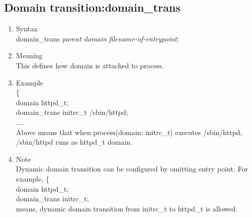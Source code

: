 \documentclass{article}
\begin{document}
\subsection{Domain transition:domain\_trans}
\begin{enumerate}
 \item Syntax\\
    domain\_trans {\it parent domain} {\it filename-of-entrypoint};
 \item Meaning\\
    This defines how domain is attached to process. 
 \item Example\\
   \{\\
   domain httpd\_t;\\
   domain\_trans initrc\_t /sbin/httpd;\\
   ....\\
   Above means that when process(domain: initrc\_t) executes
       /sbin/httpd, /sbin/httpd runs as httpd\_t domain.
 \item Note\\
       Dynamic domain transition can be configured by omitting entry
       point. For example,  
       \{\\
       domain httpd\_t;\\
       domain\_trans  initrc\_t;\\
       
       means, dynamic domain transition from initrc\_t to httpd\_t is allowed.

\end{enumerate}
\end{document}
